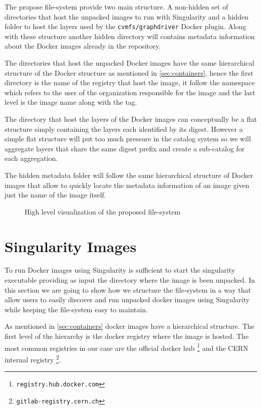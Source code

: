 The propose file-system provide two main structure. A non-hidden set of
directories that host the unpacked images to run with Singularity and a hidden
folder to host the layers used by the \texttt{cvmfs/graphdriver} Docker plugin.
Along with these structure another hidden directory will contains metadata
information about the Docker images already in the repository.

The directories that host the unpacked Docker images have the same hierarchical
structure of the Docker structure as mentioned in \ref{sec:containers}, hence
the first directory is the name of the registry that host the image, it follow
the namespace which refers to the user of the organization responsible for the
image and the last level is the image name along with the tag.

The directory that host the layers of the Docker images can conceptually be a
flat structure simply containing the layers each identified by its digest.
However a simple flat structure will put too much pressure in the catalog
system so we will aggregate layers that share the same digest prefix and create
a sub-catalog for each aggregation.

The hidden metadata folder will follow the same hierarchical structure of
Docker images that allow to quickly locate the metadata information of an image
given just the name of the image itself.

\begin{figure}
\caption{High level visualization of the proposed file-system}
\label{fig:high-level-fs}
\end{figure}


\section{Singularity Images}
\label{sec:methodology-singularity}

To run Docker images using Singularity is sufficient to start the singularity
executable providing as input the directory where the image is been unpacked.
In this section we are going to show how we structure the file-system in a way
that allow users to easily discover and run unpacked docker images using
Singularity while keeping the file-system easy to maintain.

As mentioned in \ref{sec:containers} docker images have
a hierarchical structure.  The first level of the hierarchy is the docker
registry where the image is hosted.  The most common registries in our case are
the official docker hub \footnote{\texttt{registry.hub.docker.com}} and the
CERN internal registry \footnote{\texttt{gitlab-registry.cern.ch}}.

